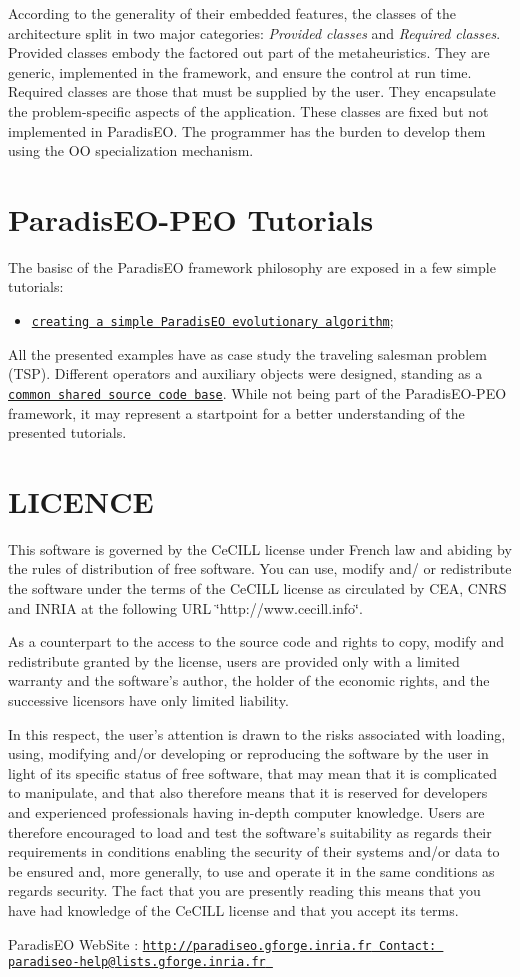 According to the generality of their embedded features, the classes of the architecture split in two major categories: {\em Provided classes\/} and {\em Required classes\/}. Provided classes embody the factored out part of the metaheuristics. They are generic, implemented in the framework, and ensure the control at run time. Required classes are those that must be supplied by the user. They encapsulate the problem-specific aspects of the application. These classes are fixed but not implemented in Paradis\-EO. The programmer has the burden to develop them using the OO specialization mechanism.\hypertarget{main_tutorials}{}\section{Paradis\-EO-PEO Tutorials}\label{main_tutorials}
The basisc of the Paradis\-EO framework philosophy are exposed in a few simple tutorials: \begin{itemize}
\item \href{lesson1/html/main.html}{\tt creating a simple Paradis\-EO evolutionary algorithm};  \end{itemize}
All the presented examples have as case study the traveling salesman problem (TSP). Different operators and auxiliary objects were designed, standing as a \href{lsnshared/html/index.html}{\tt common shared source code base}. While not being part of the Paradis\-EO-PEO framework, it may represent a startpoint for a better understanding of the presented tutorials.\hypertarget{main_LICENCE}{}\section{LICENCE}\label{main_LICENCE}
This software is governed by the Ce\-CILL license under French law and abiding by the rules of distribution of free software. You can use, modify and/ or redistribute the software under the terms of the Ce\-CILL license as circulated by CEA, CNRS and INRIA at the following URL \char`\"{}http://www.cecill.info\char`\"{}.

As a counterpart to the access to the source code and rights to copy, modify and redistribute granted by the license, users are provided only with a limited warranty and the software's author, the holder of the economic rights, and the successive licensors have only limited liability.

In this respect, the user's attention is drawn to the risks associated with loading, using, modifying and/or developing or reproducing the software by the user in light of its specific status of free software, that may mean that it is complicated to manipulate, and that also therefore means that it is reserved for developers and experienced professionals having in-depth computer knowledge. Users are therefore encouraged to load and test the software's suitability as regards their requirements in conditions enabling the security of their systems and/or data to be ensured and, more generally, to use and operate it in the same conditions as regards security. The fact that you are presently reading this means that you have had knowledge of the Ce\-CILL license and that you accept its terms.

Paradis\-EO Web\-Site : \href{http://paradiseo.gforge.inria.fr}\tt{http://paradiseo.gforge.inria.fr} Contact: \href{mailto:paradiseo-help@lists.gforge.inria.fr}\tt{paradiseo-help@lists.gforge.inria.fr} 